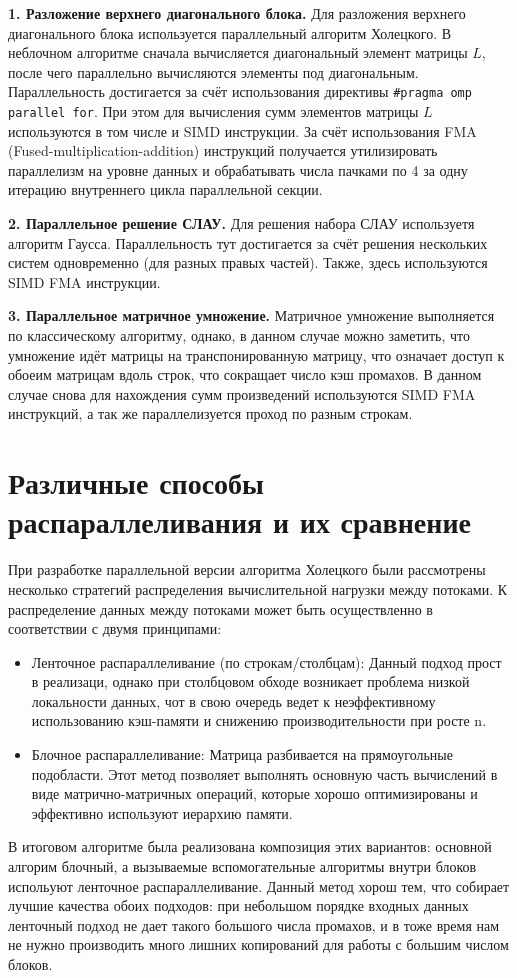 \documentclass[11pt, a4paper]{article}
\def\newsection#1{
    \section{#1}
}
\begin{document}
\textbf{1. Разложение верхнего диагонального блока.} Для разложения верхнего диагонального блока используется
параллельный алгоритм Холецкого. В неблочном алгоритме сначала вычисляется диагональный элемент матрицы $L$, после
чего параллельно вычисляются элементы под диагональным. Параллельность достигается за счёт использования директивы
\texttt{\#pragma omp parallel for}. При этом для вычисления сумм элементов матрицы $L$ используются
в том числе и SIMD инструкции. За счёт использования FMA (Fused-multiplication-addition) инструкций получается утилизировать параллелизм на уровне данных и 
обрабатывать числа пачками по 4 за одну итерацию внутреннего цикла параллельной секции.

\textbf{2. Параллельное решение СЛАУ.}  Для решения набора СЛАУ используетя алгоритм Гаусса. Параллельность тут достигается за 
счёт решения нескольких систем одновременно (для разных правых частей). Также, здесь используются SIMD FMA инструкции.

\textbf{3. Параллельное матричное умножение.} Матричное умножение выполняется по классическому алгоритму, однако, в данном
случае можно заметить, что умножение идёт матрицы на транспонированную матрицу, что означает доступ к обоеим матрицам вдоль строк,
что сокращает число кэш промахов. В данном случае снова для нахождения сумм произведений используются SIMD FMA инструкций, а так же
параллелизуется проход по разным строкам.

\newsection{Различные способы распараллеливания и их сравнение}
При разработке параллельной версии алгоритма Холецкого были рассмотрены несколько стратегий распределения вычислительной 
нагрузки между потоками. К распределение данных между потоками может быть осуществленно в соответствии с двумя принципами:
\begin{itemize}
    \item Ленточное распараллеливание (по строкам/столбцам): Данный подход прост в реализаци,  однако
        при столбцовом обходе возникает проблема низкой локальности данных,
        чот в свою очередь ведет к неэффективному использованию кэш-памяти и снижению производительности при росте n.
    \item Блочное распараллеливание: Матрица разбивается на прямоугольные подобласти. Этот метод позволяет выполнять основную часть вычислений в виде
        матрично-матричных операций, которые хорошо оптимизированы и эффективно
        используют иерархию памяти.
\end{itemize}

В итоговом алгоритме была реализована композиция этих вариантов: основной алгорим блочный, а вызываемые вспомогательные алгоритмы внутри
блоков испольуют ленточное распараллеливание. Данный метод хорош тем, что собирает лучшие качества обоих подходов:
при небольшом порядке входных данных ленточный подход не дает такого большого числа промахов, и в тоже время нам не нужно производить 
много лишних копирований для работы с большим числом блоков.
\end{document}
